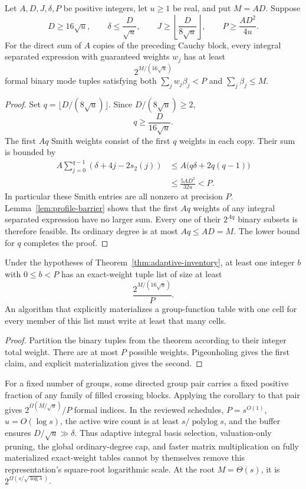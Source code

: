 \begin{theorem}
\label{thm:adaptive-inventory}
Let $A,D,J,\delta,P$ be positive integers, let $u\ge1$ be real, and put
$M=AD$.  Suppose
\[
 D\ge16\sqrt u,\qquad
 \delta\le\frac D{\sqrt u},\qquad
 J\ge\left\lfloor\frac D{8\sqrt u}\right\rfloor,
 \qquad
 P\ge\frac{AD^2}{4u}.
\]
For the direct sum of $A$ copies of the preceding Cauchy block, every
integral separated expression with guaranteed weights $w_j$ has at least
\[
 2^{M/(16\sqrt u)}
\]
formal binary mode tuples satisfying both
$\sum_jw_j\beta_j<P$ and $\sum_j\beta_j\le M$.
\end{theorem}
\begin{proof}
Set $q=\lfloor D/(8\sqrt u)\rfloor$.  Since $D/(8\sqrt u)\ge2$,
\[
 q\ge\frac D{16\sqrt u}.
\]
The first $Aq$ Smith weights consist of the first $q$ weights in each
copy.  Their sum is bounded by
\begin{align*}
 A\sum_{j=0}^{q-1}(\delta+4j-2s_2(j))
 &\le A\bigl(q\delta+2q(q-1)\bigr)\\
 &\le\frac{5AD^2}{32u}<P.
\end{align*}
In particular these Smith entries are all nonzero at precision $P$.
Lemma~\ref{lem:profile-barrier} shows that the first $Aq$ weights of
any integral separated expression have no larger sum.  Every one of
their $2^{Aq}$ binary subsets is therefore feasible.  Its ordinary
degree is at most $Aq\le AD=M$.  The lower bound for $q$ completes the
proof.
\end{proof}

\begin{corollary}
\label{cor:dense-table-barrier}
Under the hypotheses of Theorem~\ref{thm:adaptive-inventory}, at least one
integer $b$ with $0\le b<P$ has an exact-weight tuple list of size at least
\[
 \frac{2^{M/(16\sqrt u)}}P.
\]
An algorithm that explicitly materializes a group-function table with one
cell for every member of this list must write at least that many cells.
\end{corollary}
\begin{proof}
Partition the binary tuples from the theorem according to their integer
total weight.  There are at most $P$ possible weights.  Pigeonholing gives
the first claim, and explicit materialization gives the second.
\end{proof}

For a fixed number of groups, some directed group pair carries a fixed
positive fraction of any family of filled crossing blocks.  Applying the
corollary to that pair gives $2^{\Omega(M/\sqrt u)}/P$ formal indices.
In the reviewed schedules, $P=s^{O(1)}$, $u=O(\log s)$, the active wire
count is at least $s/\operatorname{polylog}s$, and the buffer ensures
$D/\sqrt u\gg\delta$.  Thus adaptive integral basis selection,
valuation-only pruning, the global ordinary-degree cap, and faster
matrix multiplication on fully materialized exact-weight tables cannot
by themselves remove this representation's square-root logarithmic
scale.  At the root $M=\Theta(s)$, it is
$2^{\Omega(s/\sqrt{\log s})}$.

